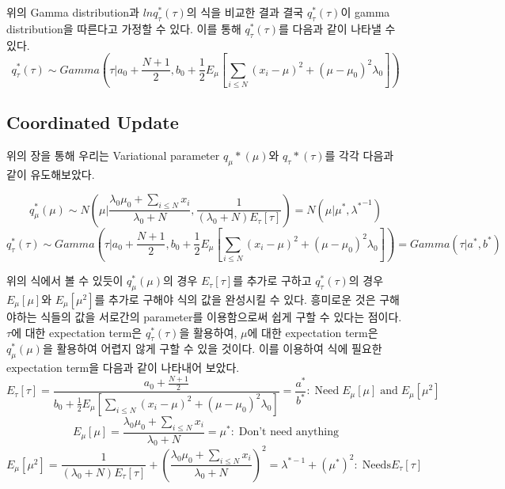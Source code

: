 \documentclass[draft=false]{oblivoir}
\begin{document}
위의 Gamma distribution과 $lnq_{\tau}^*(\tau)$의 식을 비교한 결과 결국 $q_{\tau}^*(\tau)$이 gamma distribution을 따른다고 가정할 수 있다. 이를 통해  $q_{\tau}^*(\tau)$를 다음과 같이 나타낼 수 있다. 
\begin{equation}
q_{\tau}^*(\tau) \sim Gamma\left(\tau|a_{0}+\frac{N+1}{2},b_{0}+\frac{1}{2}E_{\mu}\left[\sum_{i \leq N}(x_{i}-\mu)^2+(\mu-\mu_{0})^2\lambda_{0}\right]\right)\label{eq:11-2-11-3}
\end{equation}

\subsection{Coordinated Update}
위의 장을 통해 우리는 Variational parameter $q_{\mu}*(\mu)$와 $q_{\tau}*(\tau)$를 각각 다음과 같이 유도해보았다. 

\begin{equation}
q_{\mu}^*(\mu) \sim N \left( \mu| \frac{\lambda_{0}\mu_{0}+\sum_{i \leq N}x_{i}}{\lambda_{0}+N} , \frac{1}{(\lambda_{0}+N)E_{\tau}[\tau]}\right)
= N(\mu|\mu^*,{\lambda^*}^{-1})
\label{eq:11-2-11-4}
\end{equation}
\begin{equation}
q_{\tau}^{*}(\tau)\sim Gamma\left(\tau|a_{0}+\frac{N+1}{2},b_{0}+\frac{1}{2}E_{\mu}\left[\sum_{i \leq N}(x_{i}-\mu)^2+(\mu-\mu_{0})^2\lambda_{0}\right]\right) = Gamma(\tau|a^*,b^*) \label{eq:11-2-11-5}
\end{equation}

위의 식에서 볼 수 있듯이 $q_{\mu}^*(\mu)$의 경우 $E_{\tau}[\tau]$를 추가로 구하고 $q_{\tau}^{*}(\tau)$의 경우 $E_{\mu}[\mu]$와 $E_{\mu}[\mu^2]$를 추가로 구해야 식의 값을 완성시킬 수 있다. 흥미로운 것은 구해야하는 식들의 값을 서로간의 parameter를 이용함으로써 쉽게 구할 수 있다는 점이다. $\tau$에 대한 expectation term은 $q_{\tau}^{*}(\tau)$을 활용하여, $\mu$에 대한 expectation term은 $q_{\mu}^*(\mu)$을 활용하여 어렵지 않게 구할 수 있을 것이다. 이를 이용하여 식에 필요한 expectation term을 다음과 같이 나타내어 보았다. 
\begin{equation}
E_{\tau}[\tau]=\frac{a_{0}+\frac{N+1}{2}}{b_{0}+\frac{1}{2}E_{\mu}\left[\sum_{i \leq N}(x_{i}-\mu)^2+(\mu-\mu_{0})^2\lambda_{0}\right]}=\frac{a^*}{b^*}:\;\text{Need} \; E_{\mu}[\mu] \; \text{and} \; E_{\mu}[\mu^2]
\label{eq:11-2-11-6}
\end{equation}
\begin{equation}
E_{\mu}[\mu]=\frac{\lambda_{0}\mu_{0}+\sum_{i \leq N}x_{i}}{\lambda_{0}+N}=\mu^*:\;\text{Don't need anything}
\label{eq:11-2-11-7}
\end{equation}
\begin{equation}
E_{\mu}[\mu^2]=\frac{1}{(\lambda_{0}+N)E_{\tau}[\tau]}+(\frac{\lambda_{0}\mu_{0}+\sum_{i \leq N}x_{i}}{\lambda_{0}+N})^2=\lambda^{*-1}+(\mu^*)^2: \;\text{Needs} E_{\tau}[\tau]
\label{eq:11-2-11-8}
\end{equation}
\end{document}
